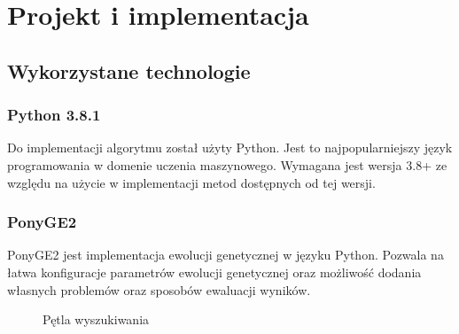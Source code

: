 \chapter{Projekt i implementacja}

\section{Wykorzystane technologie}
\subsection{Python 3.8.1}
Do implementacji algorytmu został użyty Python. Jest to najpopularniejszy język programowania w domenie uczenia maszynowego. Wymagana jest wersja 3.8+ ze względu na użycie w implementacji metod dostępnych od tej wersji.  
\subsection{PonyGE2}
PonyGE2 \cite{Fenton_2017} jest implementacja ewolucji genetycznej w języku Python. Pozwala na łatwa konfiguracje parametrów ewolucji genetycznej oraz możliwość dodania własnych problemów oraz sposobów ewaluacji wyników.

\begin{figure}[h]
	\caption{\label{fig:subcaption_example}Pętla wyszukiwania}
\end{figure}

